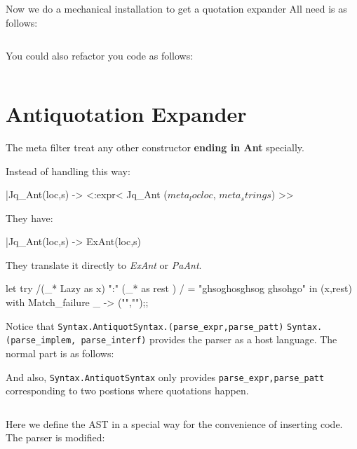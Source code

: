 Now we do a mechanical installation to get a quotation expander 
All need is as follows:

\inputminted[fontsize=\scriptsize, fontsize=\scriptsize, firstline=63,lastline=83]{ocaml}{camlp4/code/jake/json.ml}

You could also refactor you code as follows:

\inputminted[fontsize=\scriptsize, fontsize=\scriptsize, firstline=84,lastline=96]{ocaml}{camlp4/code/jake/json.ml}



\section{Antiquotation Expander}


The meta filter treat any other constructor \textbf{ending in Ant}
specially.


Instead of handling this way:

\begin{ocamlcode}
  |Jq_Ant(loc,s) -> <:expr< Jq_Ant ($meta_loc loc$, $meta_string s$) >>
\end{ocamlcode}


They have:

\begin{ocamlcode}
  |Jq_Ant(loc,s) -> ExAnt(loc,s) 
\end{ocamlcode}

They translate it directly to \textit{ExAnt} or \textit{PaAnt}.

\begin{ocamlcode}
let try /(_* Lazy as x) ":" (_* as rest ) / = "ghsoghosghsog ghsohgo"
in (x,rest)
with Match_failure _ -> ("","");;  
\end{ocamlcode}


Notice that 
\verb|Syntax.AntiquotSyntax.(parse_expr,parse_patt)|
\verb|Syntax.(parse_implem, parse_interf)|
provides the parser as a host language. The normal part is as follows:

And also, \verb|Syntax.AntiquotSyntax| only provides
\verb|parse_expr,parse_patt| corresponding to two postions where
quotations happen.


\inputminted[fontsize=\scriptsize, fontsize=\scriptsize, lastline=30]{ocaml}{camlp4/code/jake/json_ant.ml}


Here we define the AST in a special way for the convenience of
inserting code.  The parser is modified:
\inputminted[fontsize=\scriptsize, fontsize=\scriptsize, firstline=32,lastline=57]{ocaml}{camlp4/code/jake/json_ant.ml}

